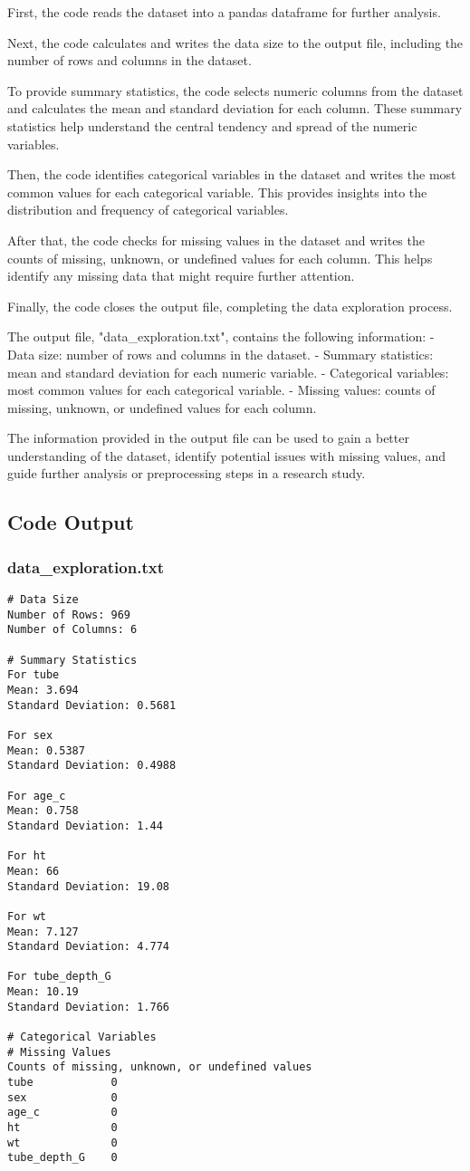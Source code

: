 \documentclass[11pt]{article}
\begin{document}
First, the code reads the dataset into a pandas dataframe for further analysis.

Next, the code calculates and writes the data size to the output file, including the number of rows and columns in the dataset.

To provide summary statistics, the code selects numeric columns from the dataset and calculates the mean and standard deviation for each column. These summary statistics help understand the central tendency and spread of the numeric variables.

Then, the code identifies categorical variables in the dataset and writes the most common values for each categorical variable. This provides insights into the distribution and frequency of categorical variables.

After that, the code checks for missing values in the dataset and writes the counts of missing, unknown, or undefined values for each column. This helps identify any missing data that might require further attention.

Finally, the code closes the output file, completing the data exploration process.

The output file, "data\_exploration.txt", contains the following information:
- Data size: number of rows and columns in the dataset.
- Summary statistics: mean and standard deviation for each numeric variable.
- Categorical variables: most common values for each categorical variable.
- Missing values: counts of missing, unknown, or undefined values for each column.

The information provided in the output file can be used to gain a better understanding of the dataset, identify potential issues with missing values, and guide further analysis or preprocessing steps in a research study.

\subsection{Code Output}

\subsubsection*{data\_exploration.txt}

\begin{Verbatim}[tabsize=4]
# Data Size
Number of Rows: 969
Number of Columns: 6

# Summary Statistics
For tube
Mean: 3.694
Standard Deviation: 0.5681

For sex
Mean: 0.5387
Standard Deviation: 0.4988

For age_c
Mean: 0.758
Standard Deviation: 1.44

For ht
Mean: 66
Standard Deviation: 19.08

For wt
Mean: 7.127
Standard Deviation: 4.774

For tube_depth_G
Mean: 10.19
Standard Deviation: 1.766

# Categorical Variables
# Missing Values
Counts of missing, unknown, or undefined values
tube            0
sex             0
age_c           0
ht              0
wt              0
tube_depth_G    0


\end{Verbatim}
\end{document}
